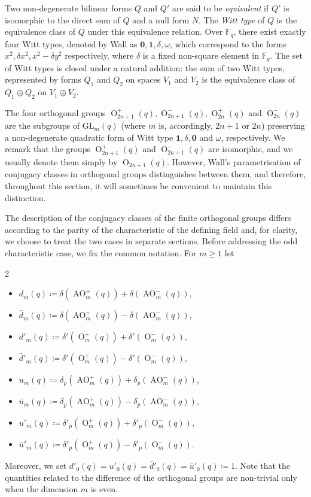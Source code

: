 \documentclass[a4paper, 12pt, oneside]{amsart}
\theoremstyle{definition}
\newcommand{\GL}{\mathrm{GL}}
\DeclareMathOperator{\AO}{AO}
\DeclareMathOperator{\Or}{O}
\begin{document}
Two non-degenerate bilinear forms $Q$ and $Q'$ are said to be \textit{equivalent} if $Q'$ is isomorphic to the direct sum of $Q$ and a null form $N$. The \textit{Witt type} of $Q$ is the equivalence class of $Q$ under this equivalence relation. Over $\mathbb{F}_q$, there exist exactly four Witt types, denoted by Wall \cite{Wall} as $\mathbf{0},\mathbf{1},\delta,\omega$, which correspond to the forms $x^2,\delta x^2,x^2-\delta y^2$ respectively, where $\delta$ is a fixed non-square element in $\mathbb{F}_q$. The set of Witt types is closed under a natural addition: the sum of two Witt types, represented by forms $Q_1$ and $Q_2$ on spaces $V_1$ and $V_2$ is the equivalence class of $Q_1\oplus Q_2$ on $V_1\oplus V_2$.

The four orthogonal groups $\Or^{+}_{2n+1}(q),\Or^{-}_{2n+1}(q),\Or^{+}_{2n}(q)$ and $\Or^{-}_{2n}(q)$ are the subgroups of $\GL_{m}(q)$ (where $m$ is, accordingly, $2n+1$ or $2n$) preserving a non-degenerate quadratic form of Witt type $\mathbf{1},\delta,\mathbf{0}$ and $\omega$, respectively. We remark that the groups $\Or^{+}_{2n+1}(q)$ and $\Or^{-}_{2n+1}(q)$ are isomorphic,
and we usually denote them simply by $\Or_{2n+1}(q)$. However, Wall's parametrisation of conjugacy classes in orthogonal groups distinguishes between them, and therefore,
throughout this section, it will sometimes be convenient to maintain this distinction.

The description of the conjugacy classes of the finite orthogonal groups differs according to the parity of the characteristic of the defining field and, for clarity,
we choose to treat the two cases in separate sections.
Before addressing the odd characteristic case, we fix the common notation.
For $m\ge1$ let
\begin{multicols}{2}
\begin{itemize}[label={}]
    \item $d_m(q) \coloneqq \delta(\AO^+_m(q))+\delta(\AO^-_m(q))$,
    \item $\bar{d}_m(q)\coloneqq \delta(\AO^+_m(q))-\delta(\AO^-_m(q))$,
    \item $d'_m(q) \coloneqq \delta'(\Or^+_m(q))+\delta'(\Or^-_m(q))$,
    \item $\bar{d}'_m(q) \coloneqq \delta'(\Or^+_m(q))-\delta'(\Or^-_m(q))$,
      \item $u_m(q) \coloneqq \delta_p(\AO^+_m(q))+\delta_p(\AO^-_m(q))$,
    \item $\bar{u}_m(q)\coloneqq \delta_p(\AO^+_m(q))-\delta_p(\AO^-_m(q))$,
    \item $u'_m(q) \coloneqq \delta'_p(\Or^+_m(q))+\delta'_p(\Or^-_m(q))$,
    \item $\bar{u}'_m(q) \coloneqq \delta'_p(\Or^+_m(q))-\delta'_p(\Or^-_m(q))$.
\end{itemize}
\end{multicols}
Moreover, we set $d'_0(q)=u'_0(q)=\bar{d}'_0(q)=\bar{u}'_0(q)\coloneqq 1$. 
Note that the quantities related to the difference of the orthogonal groups are non-trivial only when the dimension $m$ is even.
\end{document}
